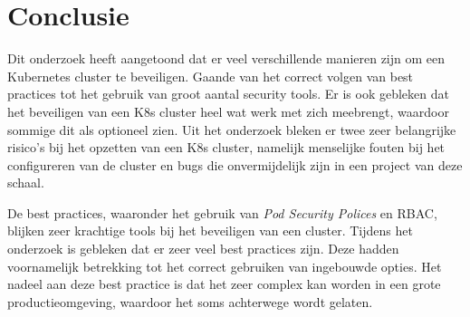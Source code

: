 
\chapter{Conclusie}
\label{ch:conclusie}




	



Dit onderzoek heeft aangetoond dat er veel verschillende manieren zijn om een Kubernetes cluster te beveiligen. Gaande van het correct volgen van best practices tot het gebruik van groot aantal security tools. Er is ook gebleken dat het beveiligen van een K8s cluster heel wat werk met zich meebrengt, waardoor sommige dit als optioneel zien. Uit het onderzoek bleken er twee zeer belangrijke risico's bij het opzetten van een K8s cluster, namelijk menselijke fouten bij het configureren van de cluster en bugs die onvermijdelijk zijn in een project van deze schaal.

De best practices, waaronder het gebruik van \textit{Pod Security Polices} en RBAC, blijken zeer krachtige tools bij het beveiligen van een cluster. Tijdens het onderzoek is gebleken dat er zeer veel best practices zijn. Deze hadden voornamelijk betrekking tot het correct gebruiken van ingebouwde opties. Het nadeel aan deze best practice is dat het zeer complex kan worden in een grote productieomgeving, waardoor het soms achterwege wordt gelaten. 

